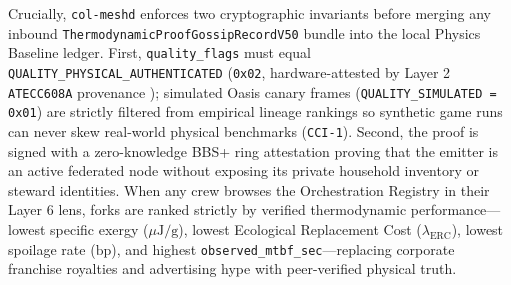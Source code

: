 Crucially, \texttt{col-meshd} enforces two cryptographic invariants before merging any inbound \texttt{ThermodynamicProofGossipRecordV50} bundle into the local Physics Baseline ledger. First, \texttt{quality\_flags} must equal \texttt{QUALITY\_PHYSICAL\_AUTHENTICATED} (\texttt{0x02}, hardware-attested by Layer 2 \texttt{ATECC608A} provenance \parencite{microchip_atecc608a}); simulated Oasis canary frames (\texttt{QUALITY\_SIMULATED = 0x01}) are strictly filtered from empirical lineage rankings so synthetic game runs can never skew real-world physical benchmarks (\texttt{CCI-1}). Second, the proof is signed with a zero-knowledge BBS+ ring attestation \parencite{camenisch2004signature} proving that the emitter is an active federated node without exposing its private household inventory or steward identities. When any crew browses the Orchestration Registry in their Layer 6 lens, forks are ranked strictly by verified thermodynamic performance---lowest specific exergy ($\mu\mathrm{J/g}$), lowest Ecological Replacement Cost ($\lambda_{\mathrm{ERC}}$), lowest spoilage rate ($\mathrm{bp}$), and highest \texttt{observed\_mtbf\_sec}---replacing corporate franchise royalties and advertising hype with peer-verified physical truth.
